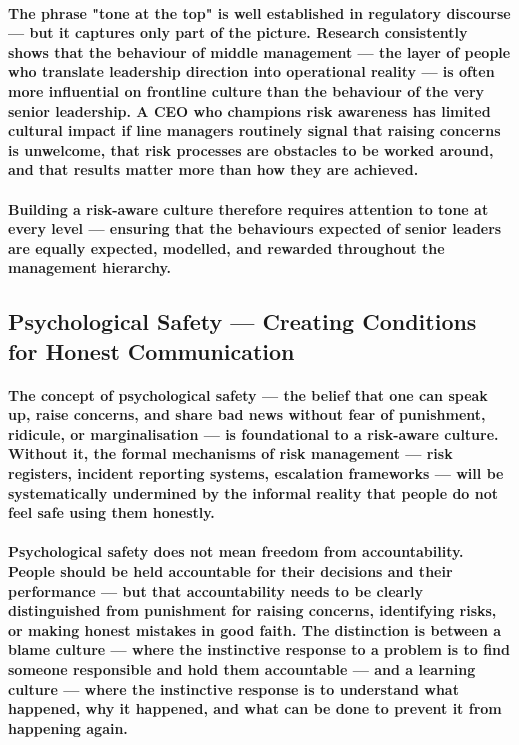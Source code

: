 \paragraph{The phrase \textbf{"tone at the top"} is well established in regulatory discourse — but it captures only part of the picture. Research consistently shows that the behaviour of \textbf{middle management} — the layer of people who translate leadership direction into operational reality — is often more influential on frontline culture than the behaviour of the very senior leadership. A CEO who champions risk awareness has limited cultural impact if line managers routinely signal that raising concerns is unwelcome, that risk processes are obstacles to be worked around, and that results matter more than how they are achieved.}
\paragraph{Building a risk-aware culture therefore requires attention to \textbf{tone at every level} — ensuring that the behaviours expected of senior leaders are equally expected, modelled, and rewarded throughout the management hierarchy.}

\subsection{Psychological Safety — Creating Conditions for Honest Communication}
\paragraph{The concept of \textbf{psychological safety} — the belief that one can speak up, raise concerns, and share bad news without fear of punishment, ridicule, or marginalisation — is foundational to a risk-aware culture. Without it, the formal mechanisms of risk management — risk registers, incident reporting systems, escalation frameworks — will be systematically undermined by the informal reality that people do not feel safe using them honestly.}
\paragraph{Psychological safety does not mean freedom from accountability. People should be held accountable for their decisions and their performance — but that accountability needs to be clearly distinguished from punishment for raising concerns, identifying risks, or making honest mistakes in good faith. The distinction is between a \textbf{blame culture} — where the instinctive response to a problem is to find someone responsible and hold them accountable — and a \textbf{learning culture} — where the instinctive response is to understand what happened, why it happened, and what can be done to prevent it from happening again.}
